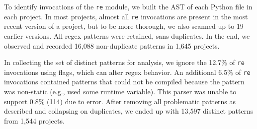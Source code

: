 To identify invocations of the {\tt re} module, we built
the AST of each Python file in each project. In most projects, almost all {\tt re} invocations are present in the
most recent version of a project, but to be more thorough, we also scanned up
to 19 earlier versions.
All regex patterns were retained, sans duplicates.
In the end, we observed and recorded 16,088 non-duplicate patterns in 1,645 projects.

In collecting the set of distinct patterns for analysis,  we ignore the 12.7\%  of {\tt re} invocations using flags, which can alter regex behavior.  An additional 6.5\% of {\tt re} invocations contained patterns that could not be compiled because the pattern was non-static (e.g., used some runtime variable).
This parser was unable to support 0.8\% (114) due to error.
After removing all problematic patterns as described and collapsing on duplicates, we ended up with 13,597 distinct patterns from 1,544 projects.



